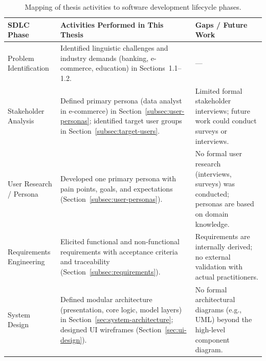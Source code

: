 \documentclass[12pt]{report} %
\begin{document}
\begin{table}[H]
    \centering
    \caption{Mapping of thesis activities to software development lifecycle phases.}
    \label{tab:sdlc-mapping}
    \begin{tabular}{p{2.8cm}p{4.5cm}p{4.2cm}}
        \hline
        \textbf{SDLC Phase}      & \textbf{Activities Performed in This Thesis}                                                                                                                          & \textbf{Gaps / Future Work}                                                                                                                            \\
        \hline
        Problem Identification   & Identified linguistic challenges and industry demands (banking, e-commerce, education) in Sections~1.1--1.2.                                                          & —                                                                                                                                                      \\
        Stakeholder Analysis     & Defined primary persona (data analyst in e-commerce) in Section~\ref{subsec:user-personas}; identified target user groups in Section~\ref{subsec:target-users}.       & Limited formal stakeholder interviews; future work could conduct surveys or interviews.                                                                \\
        User Research / Persona  & Developed one primary persona with pain points, goals, and expectations (Section~\ref{subsec:user-personas}).                                                         & No formal user research (interviews, surveys) was conducted; personas are based on domain knowledge.                                                   \\
        Requirements Engineering & Elicited functional and non-functional requirements with acceptance criteria and traceability (Section~\ref{subsec:requirements}).                                    & Requirements are internally derived; no external validation with actual practitioners.                                                                 \\
        System Design            & Defined modular architecture (presentation, core logic, model layers) in Section~\ref{sec:system-architecture}; designed UI wireframes (Section~\ref{sec:ui-design}). & No formal architectural diagrams (e.g., UML) beyond the high-level component diagram.                                                                  \\

\end{tabular}
\end{table}
\end{document}
